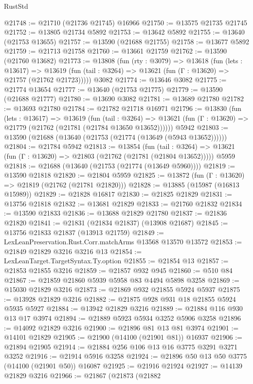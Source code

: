 \begin{lexlean}{RustStd}
\begin{coremodule}
@21748 := @21710 (@21736 @21745) @16966
@21750 := @13575 @21735 @21745
@21752 := @13805 @21734 @5892
@21753 := @13642 @5892
@21755 := @13640 (@21753 @13655)
@21757 := @13590 (@21688 @21755)
@21758 := @13677 @5892
@21759 := @21713 @21758
@21760 := @13661 @21759
@21762 := @13590 (@21760 @13682)
@21773 := @13808
    (fun (rty : @3079) =>
    @13618
      (fun (lets : @13617) =>
      @13619 (fun (tail : @3264) => @13621 (fun (Γ : @13620) => @21757 (@21762 @21723)))))
    @3082
@21774 := @13646 @3082
@21775 := @21774 @13654
@21777 := @13640 (@21753 @21775)
@21779 := @13590 (@21688 @21777)
@21780 := @13690 @3082
@21781 := @13689 @21780
@21782 := @13693 @21780
@21784 := @21782 @21718 @16971
@21796 := @13830
    (fun (lets : @13617) =>
    @13619
      (fun (tail : @3264) =>
      @13621 (fun (Γ : @13620) => @21779 (@21762 (@21781 (@21784 @13650 @13652))))))
    @5942
@21803 := @13590 (@21688 (@13640 (@21753 (@21774 (@13649 (@5943 @13652))))))
@21804 := @21784 @5942
@21813 := @13854
    (fun (tail : @3264) => @13621 (fun (Γ : @13620) => @21803 (@21762 (@21781 (@21804 @13652)))))
    @5959
@21818 := @21688 (@13640 (@21753 (@21774 (@13649 @5960))))
@21819 := @13590 @21818
@21820 := @21804 @5959
@21825 := @13872 (fun (Γ : @13620) => @21819 (@21762 (@21781 @21820)))
@21828 := @13885 (@15987 (@16813 @15989))
@21829 := @21828 @16817
@21830 := @21825 @21829
@21831 := @13756 @21818
@21832 := @13681 @21829
@21833 := @21760 @21832
@21834 := @13590 @21833
@21836 := @13688 @21829 @21780
@21837 := @21836 @21820
@21841 := @21831 (@21834 @21837) (@13908 @21687)
@21845 := @13756 @21833 @21837 (@13913 @21759)
@21849 := LexLeanPreservation.Rust.Corr.matchArms @13568 @13570 @13572
@21853 := @21849 @21829 @3216 @3216 @13
@21854 := LexLeanTarget.TargetSyntax.Ty.option
@21855 := @21854 @13
@21857 := @21853 @21855 @3216
@21859 := @21857 @932 @945
@21860 := @510 @84
@21867 := @21859 @21860 @5939 @5958 @83 @4494 @5898 @3258
@21869 := @15030 @21829 @3216
@21873 := @21869 @932 @21855 @5924 @5937
@21875 := @13928 @21829 @3216
@21882 := @21875 @928 @931 @18 @21855 @5924 @5935 @5927
@21884 := @13942 @21829 @3216
@21889 := @21884 @116 @930 @13 @17 @3974
@21894 := @21889 @5923 @5934 @3252 @5906 @3258
@21896 := @14092 @21829 @3216
@21900 := @21896 @81 @13 @81 @3974
@21901 := @14101 @21829
@21905 := @21900 (@14100 (@21901 @81)) @16937
@21906 := @21894 @21905
@21914 := @21884 @256 @106 @13 @16 @3775 @3291 @3271 @3252
@21916 := @21914 @5916 @3258
@21924 := @21896 @50 @13 @50 @3775 (@14100 (@21901 @50)) @16087
@21925 := @21916 @21924
@21927 := @14139 @21829 @3216
@21966 := @21867
    (@21873
      (@21882

\end{coremodule}
\end{lexlean}
